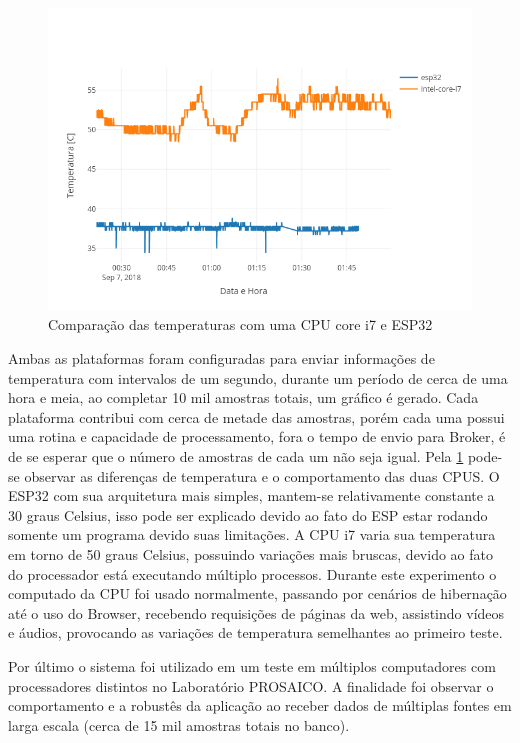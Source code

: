 \begin{figure}[h!]
\centering
\includegraphics[width=16cm]{./02_Capitulos/02_Cap4/figures/temp-device-3}
\caption{Comparação das temperaturas com uma CPU core i7 e ESP32}
\label{fig:temp-devices-3}
\end{figure}

Ambas as plataformas foram configuradas para enviar informações de temperatura com intervalos de um segundo, durante um período de cerca de uma hora e meia, ao completar 10 mil amostras totais, um gráfico é gerado. Cada plataforma contribui com cerca de metade das amostras, porém cada uma possui uma rotina e capacidade de processamento, fora o tempo de envio para Broker, é de se esperar que o número de amostras de cada um não seja igual.
Pela \ref{fig:temp-devices-3} pode-se observar as diferenças de temperatura e o comportamento das duas CPUS. O ESP32 com sua arquitetura mais simples, mantem-se relativamente constante a 30 graus Celsius,  isso pode ser explicado devido ao fato do ESP estar rodando somente um programa devido suas limitações.
A CPU i7 varia sua temperatura em torno de 50 graus Celsius, possuindo variações mais bruscas, devido ao fato do processador está executando múltiplo processos. Durante este experimento o computado da CPU foi usado normalmente, passando por cenários de hibernação até o uso do Browser, recebendo requisições de páginas da web, assistindo vídeos e áudios, provocando as variações de temperatura semelhantes ao primeiro teste.


Por último o sistema foi utilizado em um teste em múltiplos computadores com processadores distintos no Laboratório PROSAICO. A finalidade foi observar o comportamento e a robustês da aplicação ao receber dados de múltiplas fontes em larga escala (cerca de 15 mil amostras totais no banco).

